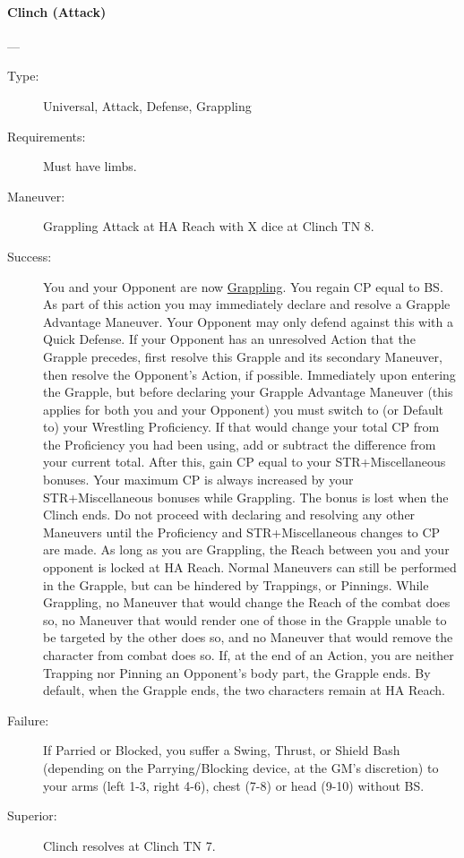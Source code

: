 \documentclass[oneside,11pt,english]{book}
\begin{document}
\paragraph{\large\label{man:Clinch (Attack)}Clinch (Attack)}---\quad{\large[X]}
\vspace{-10pt}\begin{description} 
\item [Type:] Universal, Attack, Defense, Grappling 
\item [Requirements:] Must have limbs. 
\item [Maneuver:] Grappling Attack at HA Reach with X dice at Clinch TN 8. 
\item [Success:] You and your Opponent are now \hyperref[sec:Grappling]{Grappling}. You regain CP equal to BS. As part of this action 
you may immediately declare and resolve a Grapple Advantage Maneuver. Your Opponent may only 
defend against this with a Quick Defense. If your Opponent has an unresolved Action that the Grapple 
precedes, first resolve this Grapple and its secondary Maneuver, then resolve the Opponent’s Action, if 
possible. 
Immediately upon entering the Grapple, but before declaring your Grapple Advantage Maneuver (this 
applies for both you and your Opponent) you must switch to (or Default to) your Wrestling Proficiency. If 
that would change your total CP from the Proficiency you had been using, add or subtract the difference 
from your current total. After this, gain CP equal to your STR+Miscellaneous bonuses. Your maximum 
CP is always increased by your STR+Miscellaneous bonuses while Grappling. The bonus is lost when the 
Clinch ends. 
Do not proceed with declaring and resolving any other Maneuvers until the Proficiency and 
STR+Miscellaneous changes to CP are made. 
As long as you are Grappling, the Reach between you and your opponent is locked at HA Reach. Normal 
Maneuvers can still be performed in the Grapple, but can be hindered by Trappings, or Pinnings. 
While Grappling, no Maneuver that would change the Reach of the combat does so, no Maneuver that 
would render one of those in the Grapple unable to be targeted by the other does so, and no Maneuver that 
would remove the character from combat does so. 
If, at the end of an Action, you are neither Trapping nor Pinning an Opponent's body part, the Grapple 
ends. By default, when the Grapple ends, the two characters remain at HA Reach. 
\item [Failure:] If Parried or Blocked, you suffer a Swing, Thrust, or Shield Bash (depending on the Parrying/Blocking device, at the GM's discretion) to your arms (left 1-3, right 4-6), chest (7-8) or head (9-10) without BS.
\item [Superior:] Clinch resolves at Clinch TN 7. 
\end{description}
\end{document}
